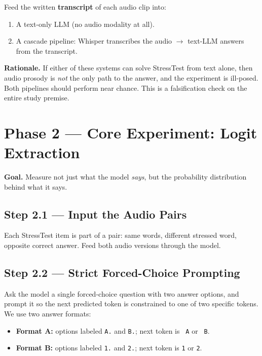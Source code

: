 \documentclass[11pt]{article}
\begin{document}
Feed the written \textbf{transcript} of each audio clip into:

\begin{enumerate}
    \item A text-only LLM (no audio modality at all).
    \item A cascade pipeline: Whisper transcribes the audio
    $\rightarrow$ text-LLM answers from the transcript.
\end{enumerate}

\textbf{Rationale.} If either of these systems can solve StressTest
from text alone, then audio prosody is \emph{not} the only path to the
answer, and the experiment is ill-posed. Both pipelines should
perform near chance. This is a falsification check on the entire
study premise.

\section{Phase 2 --- Core Experiment: Logit Extraction}

\textbf{Goal.} Measure not just what the model \emph{says}, but the
probability distribution behind what it says.

\subsection*{Step 2.1 --- Input the Audio Pairs}

Each StressTest item is part of a pair: same words, different
stressed word, opposite correct answer. Feed both audio versions
through the model.

\subsection*{Step 2.2 --- Strict Forced-Choice Prompting}

Ask the model a single forced-choice question with two answer
options, and prompt it so the next predicted token is constrained to
one of two specific tokens. We use two answer formats:

\begin{itemize}
    \item \textbf{Format A:} options labeled \texttt{A.} and
    \texttt{B.}; next token is \texttt{\ A} or \texttt{\ B}.
    \item \textbf{Format B:} options labeled \texttt{1.} and
    \texttt{2.}; next token is \texttt{1} or \texttt{2}.
\end{itemize}
\end{document}
